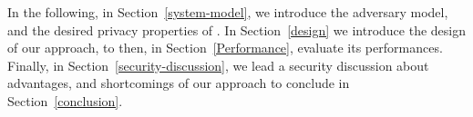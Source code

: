 
In the following, in Section~\ref{system-model}, we introduce the
adversary model, and the desired privacy properties of \name. In Section~\ref{design}
we introduce the design of our approach, to then, in Section~\ref{Performance},
evaluate its performances. Finally, in Section~\ref{security-discussion}, we lead a security discussion
about advantages, and shortcomings of our approach to conclude in
Section~\ref{conclusion}.

